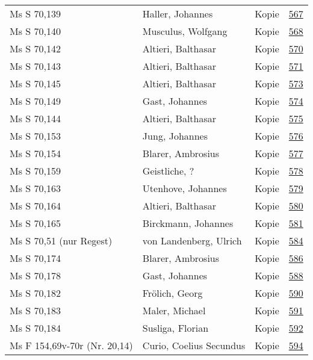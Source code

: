 \documentclass[10pt,a4paper,landscape]{report}
\begin{document}
\begin{longtable}{p{16cm}p{4cm}lr}
Ms S 70,139	&	Haller, Johannes	&	Kopie	&	\href{http://130.60.24.72/assignment/567}{567}\\
Ms S 70,140	&	Musculus, Wolfgang	&	Kopie	&	\href{http://130.60.24.72/assignment/568}{568}\\
Ms S 70,142	&	Altieri, Balthasar	&	Kopie	&	\href{http://130.60.24.72/assignment/570}{570}\\
Ms S 70,143	&	Altieri, Balthasar	&	Kopie	&	\href{http://130.60.24.72/assignment/571}{571}\\
Ms S 70,145	&	Altieri, Balthasar	&	Kopie	&	\href{http://130.60.24.72/assignment/573}{573}\\
Ms S 70,149	&	Gast, Johannes	&	Kopie	&	\href{http://130.60.24.72/assignment/574}{574}\\
Ms S 70,144	&	Altieri, Balthasar	&	Kopie	&	\href{http://130.60.24.72/assignment/575}{575}\\
Ms S 70,153	&	Jung, Johannes	&	Kopie	&	\href{http://130.60.24.72/assignment/576}{576}\\
Ms S 70,154	&	Blarer, Ambrosius	&	Kopie	&	\href{http://130.60.24.72/assignment/577}{577}\\
Ms S 70,159	&	Geistliche, ?	&	Kopie	&	\href{http://130.60.24.72/assignment/578}{578}\\
Ms S 70,163	&	Utenhove, Johannes	&	Kopie	&	\href{http://130.60.24.72/assignment/579}{579}\\
Ms S 70,164	&	Altieri, Balthasar	&	Kopie	&	\href{http://130.60.24.72/assignment/580}{580}\\
Ms S 70,165	&	Birckmann, Johannes	&	Kopie	&	\href{http://130.60.24.72/assignment/581}{581}\\
Ms S 70,51 (nur Regest)	&	von Landenberg, Ulrich	&	Kopie	&	\href{http://130.60.24.72/assignment/584}{584}\\
Ms S 70,174	&	Blarer, Ambrosius	&	Kopie	&	\href{http://130.60.24.72/assignment/586}{586}\\
Ms S 70,178	&	Gast, Johannes	&	Kopie	&	\href{http://130.60.24.72/assignment/588}{588}\\
Ms S 70,182	&	Frölich, Georg	&	Kopie	&	\href{http://130.60.24.72/assignment/590}{590}\\
Ms S 70,183	&	Maler, Michael	&	Kopie	&	\href{http://130.60.24.72/assignment/591}{591}\\
Ms S 70,184	&	Susliga, Florian	&	Kopie	&	\href{http://130.60.24.72/assignment/592}{592}\\
Ms F 154,69v-70r (Nr. 20,14)	&	Curio, Coelius Secundus	&	Kopie	&	\href{http://130.60.24.72/assignment/594}{594}\\

\end{longtable}
\end{document}
